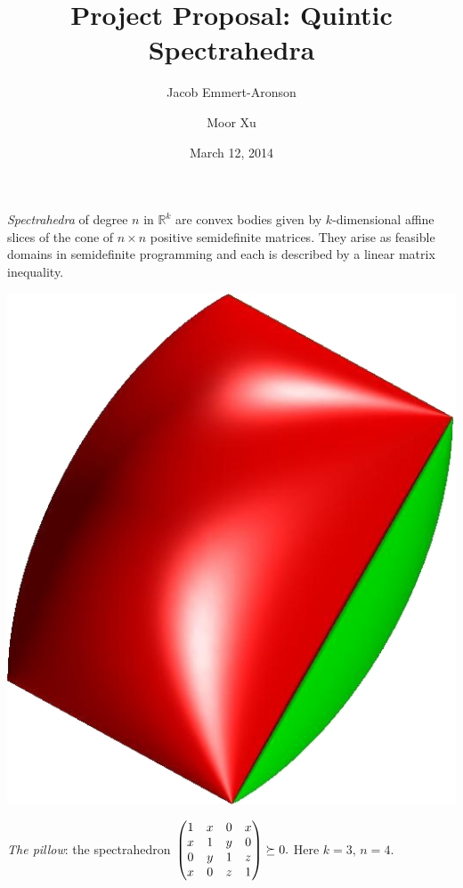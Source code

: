 \documentclass[12pt]{amsart}
\title{Project Proposal: Quintic Spectrahedra}
\author{Jacob Emmert-Aronson}
\author{Moor Xu}
\date{March 12, 2014}
\begin{document}
 
\maketitle

\emph{Spectrahedra} of degree $n$ in $\mathbb{R}^k$ are convex bodies
given by $k$-dimensional affine slices of the cone of $n \times n$
positive semidefinite matrices.  They arise as feasible domains in
semidefinite programming and each is described by a linear matrix
inequality.
\vspace\baselineskip

\begin{center}

\includegraphics[scale=.15]{pillow.jpg}
\vspace\baselineskip

{\small
\emph{The pillow}: the spectrahedron
$
\begin{pmatrix}
  1&x&0&x\\
  x&1&y&0\\
  0&y&1&z\\
  x&0&z&1
\end{pmatrix}
\succeq 0\text.$  Here $k=3,\, n=4$.}
\end{center}
\vspace\baselineskip
\end{document}
